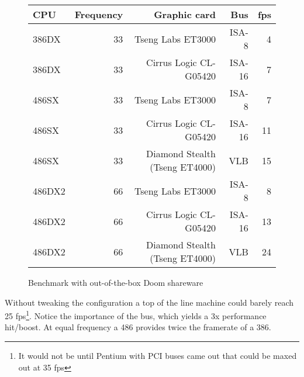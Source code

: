 \begin{figure}[H]
\centering  
\begin{tabularx}{\textwidth}{ L{1}  R{0.3} R{2.4} R{1} R{0.3} }
  \toprule
   \textbf{CPU} & \textbf{Frequency} & \textbf{Graphic card} & \textbf{Bus} & \textbf{fps}\\
  \toprule 
  386DX & 33 & Tseng Labs ET3000    & ISA-8  &  4\\
  386DX\protect\footnotemark & 33 & Cirrus Logic CL-G05420 & ISA-16 &  7\\
  \toprule 
  486SX & 33 & Tseng Labs ET3000                & ISA-8  &  7\\
  486SX & 33 & Cirrus Logic CL-G05420           & ISA-16 & 11\\ 
  486SX & 33 & Diamond Stealth (Tseng ET4000)   & VLB    & 15\\
  \toprule 
  486DX2 & 66 & Tseng Labs ET3000               & ISA-8  &  8\\
  486DX2 & 66 & Cirrus Logic CL-G05420          & ISA-16 & 13\\
  486DX2 & 66 & Diamond Stealth (Tseng ET4000)  & VLB    & 24\\
   \toprule
 \end{tabularx}
\caption{Benchmark with out-of-the-box Doom shareware}
\end{figure}
\par
Without tweaking the configuration a top of the line machine could barely reach 25 fps\footnote{It would not be until Pentium with PCI buses came out that \doom could be maxed out at 35 fps}. Notice the importance of the bus, which yields a 3x performance hit/boost. At equal frequency a 486 provides twice the framerate of a 386.\\
\par






